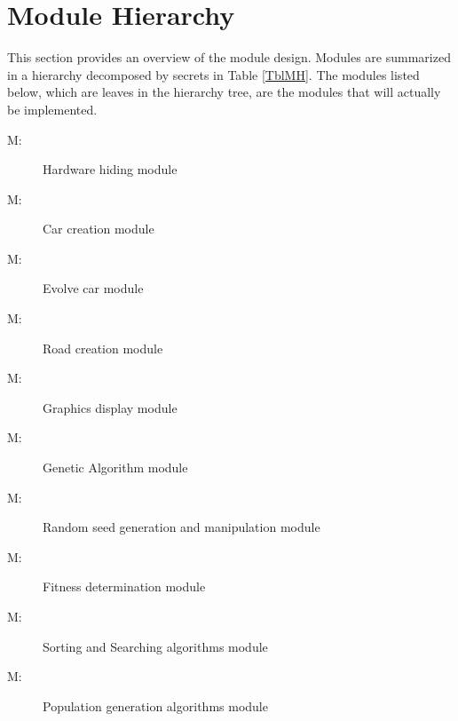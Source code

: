 \documentclass[12pt, titlepage]{article}
\newcounter{mnum}
\newcommand{\mthemnum}{M\themnum}
\begin{document}
\section{Module Hierarchy} \label{SecMH}

This section provides an overview of the module design. Modules are summarized
in a hierarchy decomposed by secrets in Table \ref{TblMH}. The modules listed
below, which are leaves in the hierarchy tree, are the modules that will
actually be implemented.

\begin{description}
\item [ \mthemnum \label{mHardware}:] Hardware hiding module
\item [ \mthemnum \label{mCreateCar}:]  Car creation module
\item [ \mthemnum \label{mEvolveCar}:] Evolve car module
\item [ \mthemnum \label{mCreateRoad}:] Road creation module
\item [ \mthemnum \label{mGraphicsDisplay}:] Graphics display module
\item [ \mthemnum \label{mGeneticAlgorithm}:] Genetic Algorithm module
\item [ \mthemnum \label{mRandomSeed}:] Random seed generation and manipulation module
\item [ \mthemnum \label{mFitness}:] Fitness determination module
\item [ \mthemnum \label{mSortingAndSearching}:] Sorting and Searching algorithms module
\item [ \mthemnum \label{mPopulationGeneration}:] Population generation algorithms module
\end{description}
\end{document}
